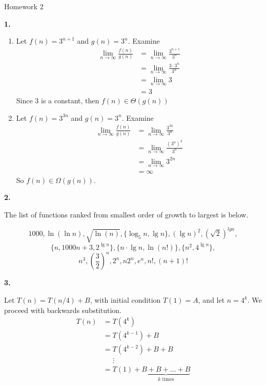 \documentclass[letterpaper, 11pt]{article}
\newcommand{\hwnumber}[1]{\medskip \noindent\textbf{#1.} \smallskip}
\begin{document}
\begin{center}
	{\LARGE Homework 2}\\
\end{center}

\hwnumber{1} 

\begin{enumerate}[label = (\alph*)]
  \item Let \(f(n) = 3^{n + 1}\) and \(g(n) = 3^n\). Examine
   \begin{align*}
     \lim_{n \to \infty} \frac{f(n)}{g(n)} &= \lim_{n \to
                                                   \infty}\frac{3^{n+1}}{3^n}\\
                                           &= \lim_{n \to \infty} \frac{3 \cdot
                                           3^n}{3^n}\\
                                           &= \lim_{n \to \infty} 3\\
                                           &= 3
   \end{align*}
   Since 3 is a constant, then \(f(n) \in \Theta(g(n))\)

 \item Let \(f(n) = 3^{3n}\) and \(g(n) = 3^n\). Examine
   \begin{align*}
     \lim_{n \to \infty} \frac{f(n)}{g(n)} &= \lim_{n \to \infty}
                                                     \frac{3^{3n}}{3^n}\\
                                           &= \lim_{n \to
                                           \infty}\frac{(3^n)^3}{3^n} \\
                                           &= \lim_{n \to \infty} 3^{2n} \\
                                           &= \infty
    \end{align*}
    So \(f(n) \in \Omega(g(n))\).
\end{enumerate}

\hwnumber{2}

\noindent The list of functions ranked from smallest order of growth to largest is below.

\[1000, \ln(\ln n), \sqrt{\ln(n)}, \{\log_5 n, \lg n\}, (\lg n)^2,
\left(\sqrt{2}\right)^{lg n},\]
\[\{n, 1000n+3, 2^{\lg n}\}, \{n\cdot\lg n, \ln(n!)\}, \{n^2, 4^{\lg n}\},\]
\[n^3, \left(\frac{3}{2}\right)^n, 2^n, n2^n, e^n, n!, (n + 1)!\]

\newpage
\hwnumber{3}

Let \(T(n) = T(n/4) + B\), with initial condition \(T(1) = A\), and let \(n =
4^k\). We proceed with backwards substitution. 
\begin{align*}
  T(n) &= T(4^k)\\
       &= T(4^{k - 1}) + B\\
       &= T(4^{k - 2}) + B + B\\
       &\;\;\;\;\;\vdots \\
       &= T(1) + \underbrace{B + B + \dots + B}_{k \text{ times}}\\
\end{align*}
\end{document}

